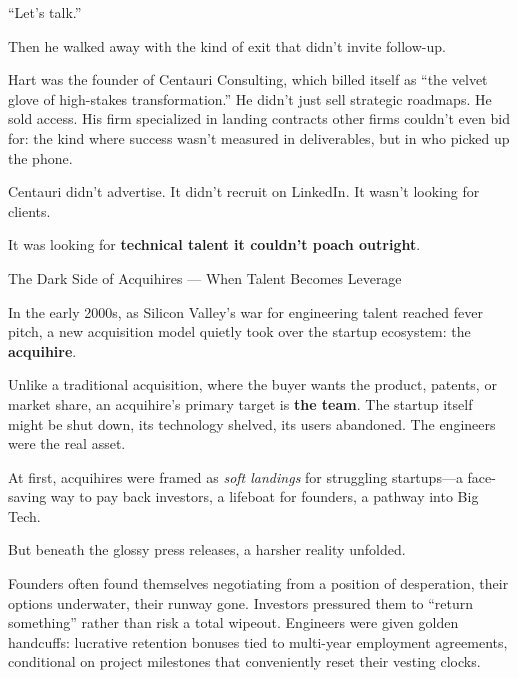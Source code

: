 ``Let’s talk.''

Then he walked away with the kind of exit that didn’t invite follow-up.

Hart was the founder of Centauri Consulting, which billed itself as ``the velvet glove of high-stakes transformation.''
He didn’t just sell strategic roadmaps. He sold access. His firm specialized in landing contracts other firms 
couldn’t even bid for: the kind where success wasn’t measured in deliverables, but in who picked up the phone.

Centauri didn’t advertise. It didn’t recruit on LinkedIn. It wasn’t looking for clients.

It was looking for \textbf{technical talent it couldn’t poach outright}.


\medskip

\begin{HistoricalSidebar}{The Dark Side of Acquihires --- When Talent Becomes Leverage}

  In the early 2000s, as Silicon Valley’s war for engineering talent reached fever pitch, a new acquisition model 
  quietly took over the startup ecosystem: the \textbf{acquihire}.

  \medskip
  
  Unlike a traditional acquisition, where the buyer wants the product, patents, or market share, an acquihire’s primary 
  target is \textbf{the team}. The startup itself might be shut down, its technology shelved, its users abandoned. The 
  engineers were the real asset.

  \medskip
  
  At first, acquihires were framed as \textit{soft landings} for struggling startups—a face-saving way to pay back 
  investors, a lifeboat for founders, a pathway into Big Tech.

  \medskip
  
  But beneath the glossy press releases, a harsher reality unfolded.

  \medskip
  
  Founders often found themselves negotiating from a position of desperation, their options underwater, their runway gone. 
  Investors pressured them to ``return something'' rather than risk a total wipeout. Engineers were given golden handcuffs: 
  lucrative retention bonuses tied to multi-year employment agreements, conditional on project milestones that conveniently 
  reset their vesting clocks.

  \medskip
  

\end{HistoricalSidebar}
